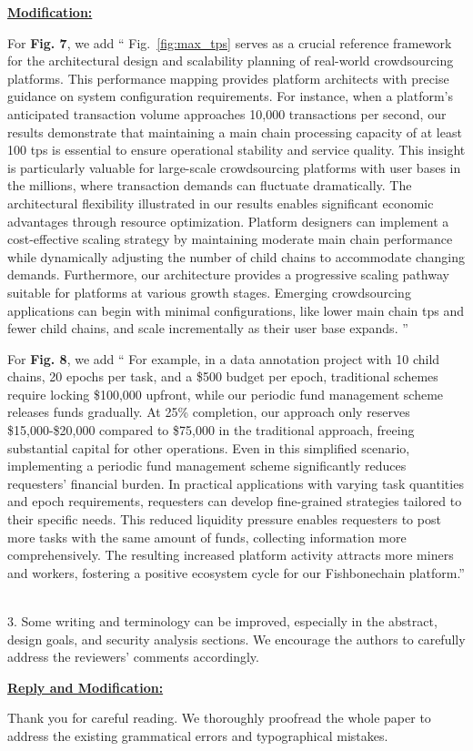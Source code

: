 {{\noindent \underline{\textbf{Modification:}}

For \textbf{Fig. 7}, we add
``
Fig.~\ref{fig:max_tps} serves as a crucial reference framework for the architectural design and scalability planning of real-world crowdsourcing platforms. This performance mapping provides platform architects with precise guidance on system configuration requirements. For instance, when a platform's anticipated transaction volume approaches 10,000 transactions per second, our results demonstrate that maintaining a main chain processing capacity of at least 100 tps is essential to ensure operational stability and service quality. This insight is particularly valuable for large-scale crowdsourcing platforms with user bases in the millions, where transaction demands can fluctuate dramatically. The architectural flexibility illustrated in our results enables significant economic advantages through resource optimization. Platform designers can implement a cost-effective scaling strategy by maintaining moderate main chain performance while dynamically adjusting the number of child chains to accommodate changing demands. Furthermore, our architecture provides a progressive scaling pathway suitable for platforms at various growth stages. Emerging crowdsourcing applications can begin with minimal configurations, like lower main chain tps and fewer child chains, and scale incrementally as their user base expands. ''

For \textbf{Fig. 8}, we add
``
For example, in a data annotation project with 10 child chains, 20 epochs per task, and a \$500 budget per epoch, traditional schemes require locking \$100,000 upfront, while our periodic fund management scheme releases funds gradually. At 25\% completion, our approach only reserves \$15,000-\$20,000 compared to \$75,000 in the traditional approach, freeing substantial capital for other operations. Even in this simplified scenario, implementing a periodic fund management scheme significantly reduces requesters' financial burden. In practical applications with varying task quantities and epoch requirements, requesters can develop fine-grained strategies tailored to their specific needs. This reduced liquidity pressure enables requesters to post more tasks with the same amount of funds, collecting information more comprehensively. The resulting increased platform activity attracts more miners and workers, fostering a positive ecosystem cycle for our Fishbonechain platform.''
}\\ %


3. Some writing and terminology can be improved, especially in the abstract, design goals, and security analysis sections.
We encourage the authors to carefully address the reviewers’ comments accordingly.

{\color{blue}
\noindent \underline{\textbf{Reply and Modification:}}

Thank you for careful reading. We thoroughly proofread the whole paper to address the existing grammatical errors and typographical mistakes.
} %

}